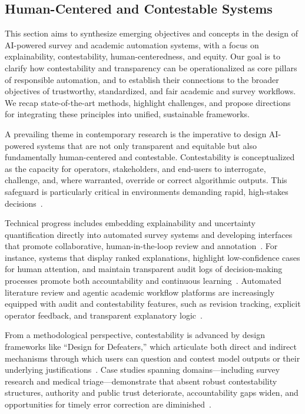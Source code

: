 \documentclass[sigconf]{acmart}
\begin{document}
\subsection{Human-Centered and Contestable Systems}

This section aims to synthesize emerging objectives and concepts in the design of AI-powered survey and academic automation systems, with a focus on explainability, contestability, human-centeredness, and equity. Our goal is to clarify how contestability and transparency can be operationalized as core pillars of responsible automation, and to establish their connections to the broader objectives of trustworthy, standardized, and fair academic and survey workflows. We recap state-of-the-art methods, highlight challenges, and propose directions for integrating these principles into unified, sustainable frameworks.

A prevailing theme in contemporary research is the imperative to design AI-powered systems that are not only transparent and equitable but also fundamentally human-centered and contestable. Contestability is conceptualized as the capacity for operators, stakeholders, and end-users to interrogate, challenge, and, where warranted, override or correct algorithmic outputs. This safeguard is particularly critical in environments demanding rapid, high-stakes decisions~\cite{ref39,ref76,ref80,ref83,ref85,ref92,ref94,ref96,ref100,ref105,ref106}.

Technical progress includes embedding explainability and uncertainty quantification directly into automated survey systems and developing interfaces that promote collaborative, human-in-the-loop review and annotation~\cite{ref39,ref80,ref83,ref85,ref100,ref105,ref106}. For instance, systems that display ranked explanations, highlight low-confidence cases for human attention, and maintain transparent audit logs of decision-making processes promote both accountability and continuous learning~\cite{ref76,ref80,ref85,ref100,ref105}. Automated literature review and agentic academic workflow platforms are increasingly equipped with audit and contestability features, such as revision tracking, explicit operator feedback, and transparent explanatory logic~\cite{ref76,ref80,ref102,ref103,ref105}.

From a methodological perspective, contestability is advanced by design frameworks like ``Design for Defeaters,'' which articulate both direct and indirect mechanisms through which users can question and contest model outputs or their underlying justifications~\cite{ref85,ref92,ref94}. Case studies spanning domains—including survey research and medical triage—demonstrate that absent robust contestability structures, authority and public trust deteriorate, accountability gaps widen, and opportunities for timely error correction are diminished~\cite{ref39,ref80,ref85,ref92,ref94}.
\end{document}
